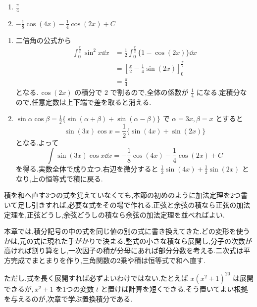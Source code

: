 \begin{enumerate}[label=(\arabic*)]
 \item $\frac\pi4$
 \item $-\frac18\cos(4x)-\frac14\cos(2x)+C$
\end{enumerate}

\begin{enumerate}[label=(\arabic*)]
 \item 二倍角の公式から
 \begin{align*}
  \int_0^{\frac\pi2}\sin^2x\dd x
  &=\frac12\int_0^{\frac\pi2}\{1-\cos(2x)\}\dd x\\
  &=\left[\frac x2-\frac14\sin(2x)\right]_0^{\frac\pi2}\\
  &=\frac\pi4
 \end{align*}
 となる.\,$\cos(2x)$ の積分で $2$ で割るので,全体の係数が $\frac14$ になる.定積分なので,任意定数は上下端で差を取ると消える.
 \item $\sin\alpha\cos\beta=\frac12\{\sin(\alpha+\beta)+\sin(\alpha-\beta)\}$ で $\alpha=3x$,\,$\beta=x$ とすると
 \[
  \sin(3x)\cos x=\frac12\{\sin(4x)+\sin(2x)\}
 \]
 となる.よって
 \[
  \int\sin(3x)\cos x\dd x
  =-\frac18\cos(4x)-\frac14\cos(2x)+C
 \]
 を得る.実数全体で成り立つ.右辺を微分すると $\frac12\sin(4x)+\frac12\sin(2x)$ となり,上の恒等式で積に戻る.
\end{enumerate}

積を和へ直す3つの式を覚えていなくても,本節の初めのように加法定理を2つ書いて足し引きすれば,必要な式をその場で作れる.正弦と余弦の積なら正弦の加法定理を,正弦どうし,余弦どうしの積なら余弦の加法定理を並べればよい.

本章では,積分記号の中の式を同じ値の別の式に書き換えてきた.どの変形を使うかは,元の式に現れた手がかりで決まる.整式の小さな積なら展開し,分子の次数が高ければ割り算をし,一次因子の積が分母にあれば部分分数を考える.二次式は平方完成でまとまりを作り,三角関数の2乗や積は恒等式で和へ直す.

ただし,式を長く展開すれば必ずよいわけではない.たとえば $x(x^2+1)^{20}$ は展開できるが,\,$x^2+1$ を1つの変数 $t$ と置けば計算を短くできる.そう置いてよい根拠を与えるのが,次章で学ぶ置換積分である.
